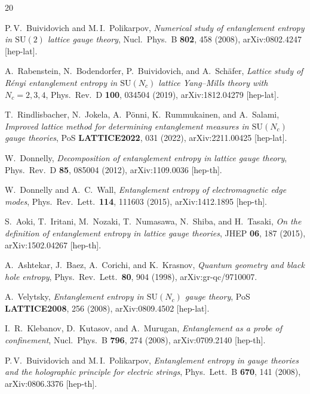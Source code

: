 \documentclass[aps,prl,reprint,superscriptaddress,floatfix,nofootinbib,amssymb]{revtex4-2}
\newcommand{\SUtwo}{\mathrm{SU}(2)}
\newcommand{\SUN}{\mathrm{SU}(N_c)}
\begin{document}
\begin{thebibliography}{20}

P.\,V.~Buividovich and M.\,I.~Polikarpov,
\emph{Numerical study of entanglement entropy in $\SUtwo$ lattice gauge theory},
Nucl.\ Phys.\ B \textbf{802}, 458 (2008), arXiv:0802.4247 [hep-lat].

A.~Rabenstein, N.~Bodendorfer, P.~Buividovich, and A.~Sch\"afer,
\emph{Lattice study of R\'enyi entanglement entropy in $\SUN$ lattice Yang--Mills theory with $N_c = 2, 3, 4$},
Phys.\ Rev.\ D \textbf{100}, 034504 (2019), arXiv:1812.04279 [hep-lat].

T.~Rindlisbacher, N.~Jokela, A.~P\"onni, K.~Rummukainen, and A.~Salami,
\emph{Improved lattice method for determining entanglement measures in $\SUN$ gauge theories},
PoS \textbf{LATTICE2022}, 031 (2022), arXiv:2211.00425 [hep-lat].

W.~Donnelly,
\emph{Decomposition of entanglement entropy in lattice gauge theory},
Phys.\ Rev.\ D \textbf{85}, 085004 (2012), arXiv:1109.0036 [hep-th].

W.~Donnelly and A.~C.~Wall,
\emph{Entanglement entropy of electromagnetic edge modes},
Phys.\ Rev.\ Lett.\ \textbf{114}, 111603 (2015), arXiv:1412.1895 [hep-th].

S.~Aoki, T.~Iritani, M.~Nozaki, T.~Numasawa, N.~Shiba, and H.~Tasaki,
\emph{On the definition of entanglement entropy in lattice gauge theories},
JHEP \textbf{06}, 187 (2015), arXiv:1502.04267 [hep-th].

A.~Ashtekar, J.~Baez, A.~Corichi, and K.~Krasnov,
\emph{Quantum geometry and black hole entropy},
Phys.\ Rev.\ Lett.\ \textbf{80}, 904 (1998), arXiv:gr-qc/9710007.

A.~Velytsky,
\emph{Entanglement entropy in $\SUN$ gauge theory},
PoS \textbf{LATTICE2008}, 256 (2008), arXiv:0809.4502 [hep-lat].

I.~R.~Klebanov, D.~Kutasov, and A.~Murugan,
\emph{Entanglement as a probe of confinement},
Nucl.\ Phys.\ B \textbf{796}, 274 (2008), arXiv:0709.2140 [hep-th].

P.\,V.~Buividovich and M.\,I.~Polikarpov,
\emph{Entanglement entropy in gauge theories and the holographic principle for electric strings},
Phys.\ Lett.\ B \textbf{670}, 141 (2008), arXiv:0806.3376 [hep-th].

\end{thebibliography}
\end{document}
